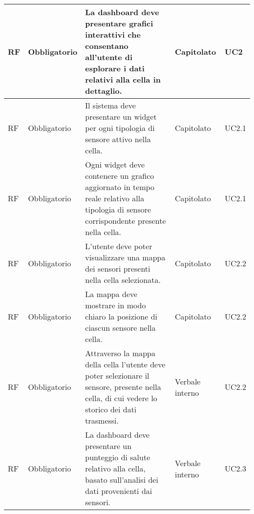 \begin{longtable}{|C{1cm}|C{2cm}|>{\raggedright}m{5cm}|C{2cm}|C{1.5cm}|}
    \hline
     RF & Obbligatorio        & La dashboard deve presentare grafici interattivi che consentano all'utente di esplorare i dati relativi alla cella in dettaglio.                                                                                                   & Capitolato      & UC2               \\
    \hline
     RF & Obbligatorio        & Il sistema deve presentare un widget per ogni tipologia di sensore attivo nella cella.                                                                                                                                             & Capitolato      & UC2.1               \\
    \hline
     RF & Obbligatorio        & Ogni widget deve contenere un grafico aggiornato in tempo reale relativo alla tipologia di sensore corrispondente presente nella cella.                                                                                            & Capitolato      & UC2.1               \\
    \hline
     RF & Obbligatorio        & L'utente deve poter visualizzare una mappa dei sensori presenti nella cella selezionata.                                                                                                                                           & Capitolato      & UC2.2               \\
    \hline
     RF & Obbligatorio        & La mappa deve mostrare in modo chiaro la posizione di ciascun sensore nella cella.                                                                                                                                                 & Capitolato      & UC2.2               \\
    \hline
     RF & Obbligatorio        & Attraverso la mappa della cella l'utente deve poter selezionare il sensore, presente nella cella, di cui vedere lo storico dei dati trasmessi.       & Verbale interno      & UC2.2               \\
    \hline
     RF & Obbligatorio        & La dashboard deve presentare un punteggio di salute relativo alla cella, basato sull'analisi dei dati provenienti dai sensori.                                                                                                     & Verbale interno      & UC2.3               \\

\end{longtable}
